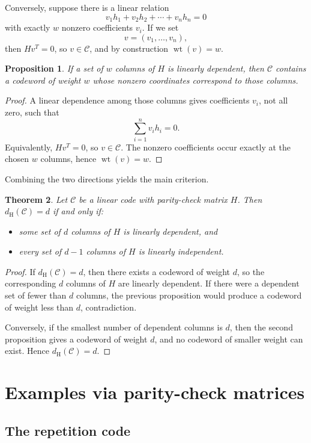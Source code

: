 \documentclass[11pt]{article}
\newtheorem{proposition}{Proposition}[section]
\newtheorem{theorem}[proposition]{Theorem}
\theoremstyle{definition}
\theoremstyle{remark}
\newcommand{\code}{\mathcal{C}}
\newcommand{\wt}{\operatorname{wt}}
\newcommand{\dH}{d_{\mathrm H}}
\begin{document}
Conversely, suppose there is a linear relation
\[
v_1h_1+v_2h_2+\cdots+v_nh_n=0
\]
with exactly $w$ nonzero coefficients $v_i$. If we set
\[
v=(v_1,\dots,v_n),
\]
then $Hv^T=0$, so $v\in\code$, and by construction $\wt(v)=w$.

\begin{proposition}
If a set of $w$ columns of $H$ is linearly dependent, then $\code$ contains a codeword of weight $w$ whose nonzero coordinates correspond to those columns.
\end{proposition}

\begin{proof}
A linear dependence among those columns gives coefficients $v_i$, not all zero, such that
\[
\sum_{i=1}^n v_i h_i=0.
\]
Equivalently, $Hv^T=0$, so $v\in\code$. The nonzero coefficients occur exactly at the chosen $w$ columns, hence $\wt(v)=w$.
\end{proof}

Combining the two directions yields the main criterion.

\begin{theorem}
Let $\code$ be a linear code with parity-check matrix $H$. Then $\dH(\code)=d$ if and only if:
\begin{itemize}[leftmargin=1.4em]
    \item some set of $d$ columns of $H$ is linearly dependent, and
    \item every set of $d-1$ columns of $H$ is linearly independent.
\end{itemize}
\end{theorem}

\begin{proof}
If $\dH(\code)=d$, then there exists a codeword of weight $d$, so the corresponding $d$ columns of $H$ are linearly dependent. If there were a dependent set of fewer than $d$ columns, the previous proposition would produce a codeword of weight less than $d$, contradiction.

Conversely, if the smallest number of dependent columns is $d$, then the second proposition gives a codeword of weight $d$, and no codeword of smaller weight can exist. Hence $\dH(\code)=d$.
\end{proof}

\section{Examples via parity-check matrices}

\subsection{The repetition code}
\end{document}
